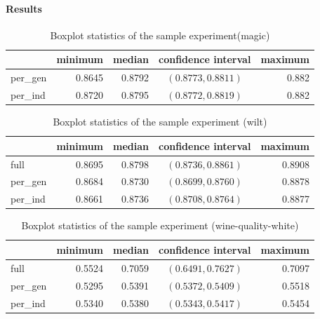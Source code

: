 \paragraph{Results}

\begin{table}[ht]
\centering
\caption{Boxplot statistics of the sample experiment(magic)}\label{tab04:exp1:magboxstats}

\begin{tabular}{lrrcr}
\toprule
{} &  minimum &  median &  confidence interval &  maximum \\
\midrule
per\_gen &   0.8645 &  0.8792 & $(0.8773,0.8811)$ &    0.882 \\
per\_ind &   0.8720 &  0.8795 & $(0.8772,0.8819)$ &    0.882 \\
\bottomrule
\end{tabular}

\end{table}

\begin{table}[ht]
\centering
\caption{Boxplot statistics of the sample experiment (wilt)}\label{tab04:exp1:wboxstats}

\begin{tabular}{lrrcr}
\toprule
{} &  minimum & median & confidence interval &  maximum \\
\midrule
full     &   0.8695 &  0.8798 &   $(0.8736,0.8861)$ &   0.8908 \\
per\_gen &   0.8684 &  0.8730 &   $(0.8699,0.8760)$ &   0.8878 \\
per\_ind &   0.8661 &  0.8736 &   $(0.8708,0.8764)$ &   0.8877 \\
\bottomrule
\end{tabular}

\end{table}

\begin{table}[ht]
\centering
\caption{Boxplot statistics of the sample experiment (wine-quality-white)}\label{tab04:exp1:wineboxstats}

\begin{tabular}{lrrcr}
\toprule
{} &  minimum &  median & confidence interval &  maximum \\
\midrule
full     &   0.5524 &  0.7059 &   $(0.6491,0.7627)$ &   0.7097 \\
per\_gen &   0.5295 &  0.5391 &   $(0.5372,0.5409)$ &   0.5518 \\
per\_ind &   0.5340 &  0.5380 &   $(0.5343,0.5417)$ &   0.5454 \\
\bottomrule
\end{tabular}

\end{table}

